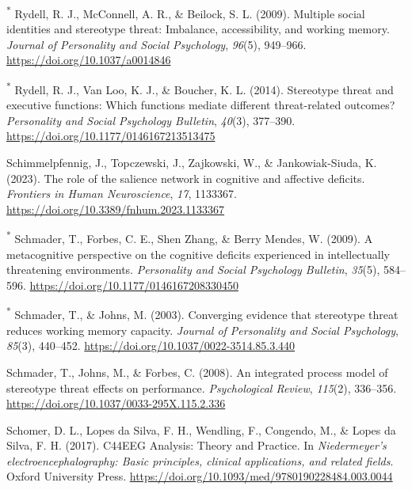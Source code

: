 \documentclass[
  stu, a4paper,floatsintext]{apa7}
\newlength{\cslhangindent}
\newenvironment{CSLReferences}[2] %
 {\begin{list}{}{%
  \setlength{\itemindent}{0pt}
  \setlength{\leftmargin}{0pt}
  \setlength{\parsep}{0pt}
  \ifodd #1
   \setlength{\leftmargin}{\cslhangindent}
   \setlength{\itemindent}{-1\cslhangindent}
  \fi
  \setlength{\itemsep}{#2\baselineskip}}}
 {\end{list}}
\begin{document}
\begin{CSLReferences}{1}{0}
\textsuperscript{*} Rydell, R. J., McConnell, A. R., \& Beilock, S. L. (2009). Multiple social identities and stereotype threat: {Imbalance}, accessibility, and working memory. \emph{Journal of Personality and Social Psychology}, \emph{96}(5), 949--966. \url{https://doi.org/10.1037/a0014846}

\textsuperscript{*} Rydell, R. J., Van Loo, K. J., \& Boucher, K. L. (2014). Stereotype threat and executive functions: {Which} functions mediate different threat-related outcomes? \emph{Personality and Social Psychology Bulletin}, \emph{40}(3), 377--390. \url{https://doi.org/10.1177/0146167213513475}

Schimmelpfennig, J., Topczewski, J., Zajkowski, W., \& Jankowiak-Siuda, K. (2023). The role of the salience network in cognitive and affective deficits. \emph{Frontiers in Human Neuroscience}, \emph{17}, 1133367. \url{https://doi.org/10.3389/fnhum.2023.1133367}

\textsuperscript{*} Schmader, T., Forbes, C. E., Shen Zhang, \& Berry Mendes, W. (2009). A metacognitive perspective on the cognitive deficits experienced in intellectually threatening environments. \emph{Personality and Social Psychology Bulletin}, \emph{35}(5), 584--596. \url{https://doi.org/10.1177/0146167208330450}

\textsuperscript{*} Schmader, T., \& Johns, M. (2003). Converging evidence that stereotype threat reduces working memory capacity. \emph{Journal of Personality and Social Psychology}, \emph{85}(3), 440--452. \url{https://doi.org/10.1037/0022-3514.85.3.440}

Schmader, T., Johns, M., \& Forbes, C. (2008). An integrated process model of stereotype threat effects on performance. \emph{Psychological Review}, \emph{115}(2), 336--356. \url{https://doi.org/10.1037/0033-295X.115.2.336}

Schomer, D. L., Lopes da Silva, F. H., Wendling, F., Congendo, M., \& Lopes da Silva, F. H. (2017). {C44EEG Analysis}: {Theory} and {Practice}. In \emph{Niedermeyer's electroencephalography: {Basic} principles, clinical applications, and related fields}. Oxford University Press. \url{https://doi.org/10.1093/med/9780190228484.003.0044}


\end{CSLReferences}
\end{document}
